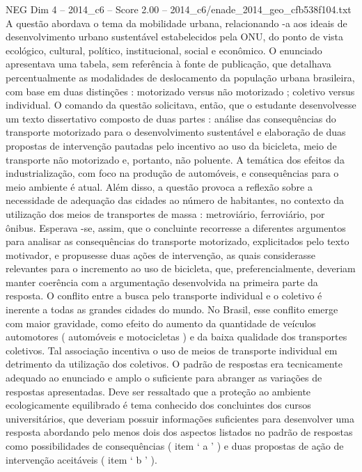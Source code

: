 \begin{textsample}{NEG Dim 4 – 2014\_c6 – Score 2.00 – 2014\_c6/enade\_2014\_geo\_cfb538f104.txt}
A questão abordava o tema da mobilidade urbana, relacionando -a aos ideais de desenvolvimento urbano sustentável estabelecidos pela ONU, do ponto de vista ecológico, cultural, político, institucional, social e econômico.
O enunciado apresentava uma tabela, sem referência à fonte de publicação, que detalhava percentualmente as modalidades de deslocamento da população urbana brasileira, com base em duas distinções : motorizado versus não motorizado ; coletivo versus individual.
O comando da questão solicitava, então, que o estudante desenvolvesse um texto dissertativo composto de duas partes : análise das consequências do transporte motorizado para o desenvolvimento sustentável e elaboração de duas propostas de intervenção pautadas pelo incentivo ao uso da bicicleta, meio de transporte não motorizado e, portanto, não poluente.
A temática dos efeitos da industrialização, com foco na produção de automóveis, e consequências para o meio ambiente é atual.
Além disso, a questão provoca a reflexão sobre a necessidade de adequação das cidades ao número de habitantes, no contexto da utilização dos meios de transportes de massa : metroviário, ferroviário, por ônibus.
Esperava -se, assim, que o concluinte recorresse a diferentes argumentos para analisar as consequências do transporte motorizado, explicitados pelo texto motivador, e propusesse duas ações de intervenção, as quais considerasse relevantes para o incremento ao uso de bicicleta, que, preferencialmente, deveriam manter coerência com a argumentação desenvolvida na primeira parte da resposta.
O conflito entre a busca pelo transporte individual e o coletivo é inerente a todas as grandes cidades do mundo.
No Brasil, esse conflito emerge com maior gravidade, como efeito do aumento da quantidade de veículos automotores ( automóveis e motocicletas ) e da baixa qualidade dos transportes coletivos.
Tal associação incentiva o uso de meios de transporte individual em detrimento da utilização dos coletivos.
O padrão de respostas era tecnicamente adequado ao enunciado e amplo o suficiente para abranger as variações de respostas apresentadas.
Deve ser ressaltado que a proteção ao ambiente ecologicamente equilibrado é tema conhecido dos concluintes dos cursos universitários, que deveriam possuir informações suficientes para desenvolver uma resposta abordando pelo menos dois dos aspectos listados no padrão de respostas como possibilidades de consequências ( item ‘ a ’ ) e duas propostas de ação de intervenção aceitáveis ( item ‘ b ’ ).

\end{textsample}
